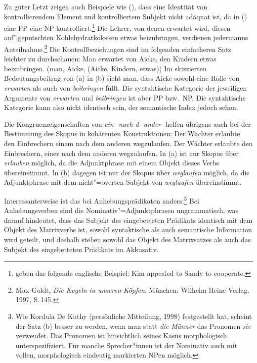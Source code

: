 Zu guter Letzt zeigen auch Beispiele wie (), dass eine Identität von kontrollierendem Element und kontrolliertem
Subjekt nicht adäquat ist, da in () eine PP eine NP kontrolliert.\footnote{%
        \citet*[]{ps2} geben das folgende englische
        Beispiel:
        \ea
        Kim appealed to Sandy to cooperate.
        \z
}
\ea{}
Die Lehrer, von denen erwartet wird, diesen auf"|geputschten Kohlehydratkolossen etwas beizubringen,
verdienen jedermanns Anteilnahme.\footnote{
        Max Goldt, \emph{Die Kugeln in unseren Köpfen}. München: Wilhelm Heine Verlag. 1997, S.\,145.
}
\z
Die Kontrollbeziehungen sind im folgenden einfacheren Satz leichter zu durchschauen:
\eal
\ex Man erwartet von Aicke, den Kindern etwas beizubringen.
\ex {}(man, Aicke, (Aicke, Kindern, etwas))
\zl
Im skizzierten Bedeutungsbeitrag von (a) in (b) sieht man, dass Aicke sowohl eine Rolle
von \emph{erwarten} als auch von \emph{beibringen} füllt. Die syntaktische Kategorie der jeweiligen
Argumente von \emph{erwarten} und \emph{beibringen} ist aber PP bzw.\ NP. Die syntaktische Kategorie
kann also nicht identisch sein, der semantische Index jedoch schon.

Die Kongruenzeigenschaften von {\em ein- nach d- ander-} helfen übrigens auch
bei der Bestimmung des Skopus in kohärenten Konstruktionen:
\eal
\ex Der Wächter erlaubte den Einbrechern    einem     nach  dem anderen wegzulaufen.
\ex Der Wächter erlaubte den Einbrechern,   einer     nach  dem anderen wegzulaufen.
\zl
In (a) ist nur Skopus über \emph{erlauben} möglich, da die Adjunktphrase mit einem Objekt dieses Verbs
übereinstimmt. In (b) dagegen ist nur der Skopus über \emph{weglaufen} möglich, da die Adjunktphrase
mit dem nicht"=overten Subjekt von \emph{weglaufen} übereinstimmt.

Interessanterweise ist das bei Anhebungsprädikaten anders:\footnote{
       Wie Kordula De Kuthy (persönliche Mitteilung, 1998) festgestellt hat, scheint der Satz (b) besser zu werden,
       wenn man statt \emph{die Männer} das Pronomen \emph{sie} verwendet.
        \z
        Das Pronomen ist hinsichtlich seines Kasus morphologisch unterspezifiziert. Für manche Sprecher*innen
        ist der Nominativ auch mit vollen, morphologisch eindeutig markierten NPen möglich.
}
\eal
{}
\zl
Bei Anhebungsverben sind die Nominativ"=Adjunktphrasen ungrammatisch, was darauf hindeutet,
dass das Subjekt des eingebetteten Prädikats identisch mit dem Objekt des Matrixverbs ist, \dash
sowohl syntaktische als auch semantische Information wird geteilt, und deshalb stehen sowohl das Objekt
des Matrixsatzes als auch das Subjekt des eingebetteten Prädikats im Akkusativ.

